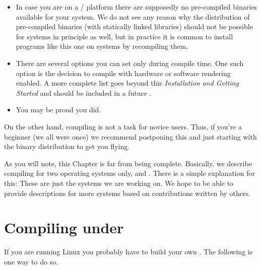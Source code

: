 \begin{itemize}
\item In case you are on a / platform there are supposedly no
pre-compiled binaries available for your system. We do not
see any reason why the distribution of pre-compiled binaries (with statically linked
libraries) should not be possible for  systems in principle as well, but in
practice it is common to install programs like this one on  systems by
recompiling them.

\item There are several options you can set only during
compile time. One such option is the decision to compile with
hardware or software  rendering enabled. A more
complete list goes beyond this \textit{Installation and Getting
Started} and should be included in a future
\textit{}.

\item You may be proud you did.
\end{itemize}

On the other hand, compiling \FlightGear is not a task for novice users. Thus, if you're
a beginner (we all were once) we recommend postponing this and just starting with the
binary distribution to get you flying.

As you will note, this Chapter is far from being complete. Basically, we describe
compiling for two operating systems only,  and . There
is a simple explanation for this: These are just the systems we are working on. We hope
to be able to provide descriptions for more systems based on contributions written by
others.

\section{Compiling under }

If you are running Linux you probably have to build your own
. The following is one way to do so.

